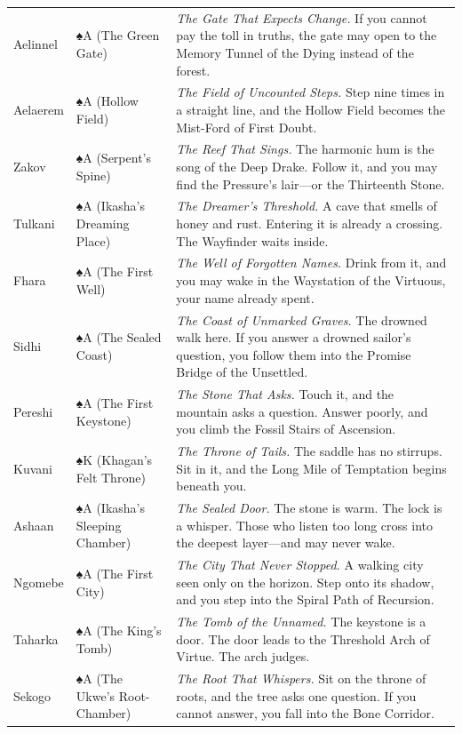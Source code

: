 \begin{longtable}{p{} p{} p{}}
Aelinnel & ♠A (The Green Gate) & \textit{The Gate That Expects Change.} If you cannot pay the toll in truths, the gate may open to the Memory Tunnel of the Dying instead of the forest. \\
Aelaerem & ♠A (Hollow Field) & \textit{The Field of Uncounted Steps.} Step nine times in a straight line, and the Hollow Field becomes the Mist-Ford of First Doubt. \\
Zakov & ♠A (Serpent's Spine) & \textit{The Reef That Sings.} The harmonic hum is the song of the Deep Drake. Follow it, and you may find the Pressure's lair---or the Thirteenth Stone. \\
Tulkani & ♠A (Ikasha's Dreaming Place) & \textit{The Dreamer's Threshold.} A cave that smells of honey and rust. Entering it is already a crossing. The Wayfinder waits inside. \\
Fhara & ♠A (The First Well) & \textit{The Well of Forgotten Names.} Drink from it, and you may wake in the Waystation of the Virtuous, your name already spent. \\
Sidhi & ♠A (The Sealed Coast) & \textit{The Coast of Unmarked Graves.} The drowned walk here. If you answer a drowned sailor's question, you follow them into the Promise Bridge of the Unsettled. \\
Pereshi & ♠A (The First Keystone) & \textit{The Stone That Asks.} Touch it, and the mountain asks a question. Answer poorly, and you climb the Fossil Stairs of Ascension. \\
Kuvani & ♠K (Khagan's Felt Throne) & \textit{The Throne of Tails.} The saddle has no stirrups. Sit in it, and the Long Mile of Temptation begins beneath you. \\
Ashaan & ♠A (Ikasha's Sleeping Chamber) & \textit{The Sealed Door.} The stone is warm. The lock is a whisper. Those who listen too long cross into the deepest layer---and may never wake. \\
Ngomebe & ♠A (The First City) & \textit{The City That Never Stopped.} A walking city seen only on the horizon. Step onto its shadow, and you step into the Spiral Path of Recursion. \\
Taharka & ♠A (The King's Tomb) & \textit{The Tomb of the Unnamed.} The keystone is a door. The door leads to the Threshold Arch of Virtue. The arch judges. \\
Sekogo & ♠A (The Ukwe's Root-Chamber) & \textit{The Root That Whispers.} Sit on the throne of roots, and the tree asks one question. If you cannot answer, you fall into the Bone Corridor. \\

\end{longtable}

